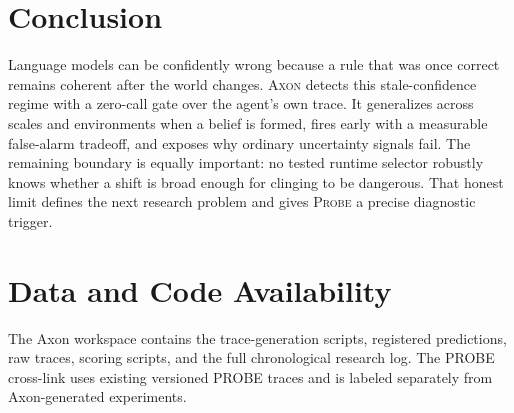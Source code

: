 \documentclass[pdflatex,sn-basic]{sn-jnl}
\theoremstyle{definition}
\newcommand{\axon}{\textsc{Axon}}
\newcommand{\probe}{\textsc{Probe}}
\begin{document}
\section{Conclusion}
\label{sec:conclusion}

Language models can be confidently wrong because a rule that was once correct remains coherent
after the world changes. \axon{} detects this stale-confidence regime with a zero-call gate
over the agent's own trace. It generalizes across scales and environments when a belief is
formed, fires early with a measurable false-alarm tradeoff, and exposes why ordinary uncertainty
signals fail. The remaining boundary is equally important: no tested runtime selector robustly
knows whether a shift is broad enough for clinging to be dangerous. That honest limit defines
the next research problem and gives \probe{} a precise diagnostic trigger.

\section*{Data and Code Availability}

The Axon workspace contains the trace-generation scripts, registered predictions, raw traces,
scoring scripts, and the full chronological research log. The PROBE cross-link uses existing
versioned PROBE traces and is labeled separately from Axon-generated experiments.

\appendix
\end{document}
